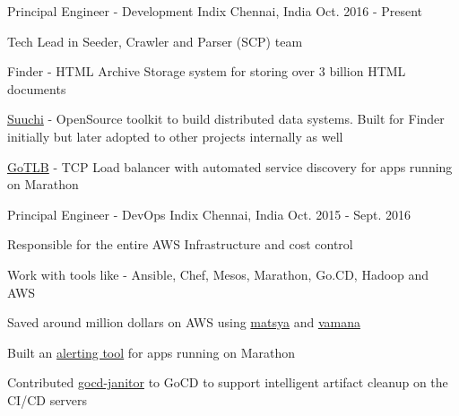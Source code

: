

\begin{cventries}

  \cventry
    {Principal Engineer - Development} %
    {Indix} %
    {Chennai, India} %
    {Oct. 2016 - Present} %
    {
      \begin{cvitems} %
        \item {Tech Lead in Seeder, Crawler and Parser (SCP) team}
        \item {Finder - HTML Archive Storage system for storing over 3 billion HTML documents}
        \item {\href{https://github.com/ashwanthkumar/suuchi}{Suuchi} - OpenSource toolkit to build distributed data systems. Built for Finder initially but later adopted to other projects internally as well}
        \item {\href{https://github.com/ashwanthkumar/gotlb}{GoTLB} - TCP Load balancer with automated service discovery for apps running on Marathon}
      \end{cvitems}
    }

  \cventry
    {Principal Engineer - DevOps} %
    {Indix} %
    {Chennai, India} %
    {Oct. 2015 - Sept. 2016} %
    {
      \begin{cvitems} %
        \item {Responsible for the entire AWS Infrastructure and cost control}
        \item {Work with tools like - Ansible, Chef, Mesos, Marathon, Go.CD, Hadoop and AWS}
        \item {Saved around million dollars on AWS using \href{https://github.com/indix/matsya}{matsya} and \href{https://github.com/indix/vamana}{vamana}}
        \item {Built an \href{https://github.com/ashwanthkumar/marathon-alerts}{alerting tool} for apps running on Marathon}
        \item {Contributed \href{https://github.com/ashwanthkumar/gocd-janitor}{gocd-janitor} to GoCD to support intelligent artifact cleanup on the CI/CD servers}
      \end{cvitems}
    }


\end{cventries}
